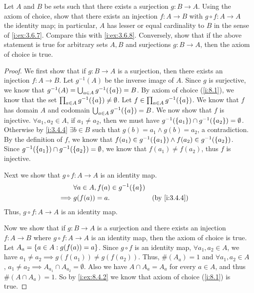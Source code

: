 \begin{ex}\label{i:ex:8.4.3}
  Let \(A\) and \(B\) be sets such that there exists a surjection \(g : B \to A\).
  Using the axiom of choice, show that there exists an injection \(f: A \to B\) with \(g \circ f : A \to A\) the identity map;
  in particular, \(A\) has lesser or equal cardinality to \(B\) in the sense of \cref{i:ex:3.6.7}.
  Compare this with \cref{i:ex:3.6.8}.
  Conversely, show that if the above statement is true for arbitrary sets \(A, B\) and surjections \(g : B \to A\), then the axiom of choice is true.
\end{ex}

\begin{proof}
  We first show that if \(g : B \to A\) is a surjection, then there exists an injection \(f : A \to B\).
  Let \(g^{-1}(A)\) be the inverse image of \(A\).
  Since \(g\) is surjective, we know that \(g^{-1}(A) = \bigcup_{a \in A} g^{-1}(\left\lbrace a\right\rbrace) = B\).
  By axiom of choice (\cref{i:8.1}), we know that the set \(\prod_{a \in A} g^{-1}(\left\lbrace a\right\rbrace) \neq \emptyset\).
  Let \(f \in \prod_{a \in A} g^{-1}(\left\lbrace a\right\rbrace)\).
  We know that \(f\) has domain \(A\) and codomain \(\bigcup_{a \in A} g^{-1}(\left\lbrace a\right\rbrace) = B\).
  We now show that \(f\) is injective.
  \(\forall a_1, a_2 \in A\), if \(a_1 \neq a_2\), then we must have \(g^{-1}(\left\lbrace a_1\right\rbrace) \cap g^{-1}(\left\lbrace a_2\right\rbrace) = \emptyset\).
  Otherwise by \cref{i:3.4.4} \(\exists b \in B\) such that \(g(b) = a_1 \land g(b) = a_2\), a contradiction.
  By the definition of \(f\), we know that \(f(a_1) \in g^{-1}(\left\lbrace a_1\right\rbrace) \land f(a_2) \in g^{-1}(\left\lbrace a_2\right\rbrace)\).
  Since \(g^{-1}(\left\lbrace a_1\right\rbrace) \cap g^{-1}(\left\lbrace a_2\right\rbrace) = \emptyset\), we know that \(f(a_1) \neq f(a_2)\), thus \(f\) is injective.

  Next we show that \(g \circ f : A \to A\) is an identity map.
  \begin{align*}
             & \forall a \in A, f(a) \in g^{-1}(\set{a})                   \\
    \implies & g(f(a)) = a.                              &  & \by{i:3.4.4}
  \end{align*}
  Thus, \(g \circ f : A \to A\) is an identity map.

  Now we show that if \(g : B \to A\) is a surjection and there exists an injection \(f : A \to B\) where \(g \circ f : A \to A\) is an identity map, then the axiom of choice is true.
  Let \(A_a = \left\lbrace a \in A : g(f(a)) = a\right\rbrace\).
  Since \(g \circ f\) is an identity map, \(\forall a_1, a_2 \in A\), we have \(a_1 \neq a_2 \implies g(f(a_1)) \neq g(f(a_2))\).
  Thus, \(\#(A_a) = 1\) and \(\forall a_1, a_2 \in A\), \(a_1 \neq a_2 \implies A_{a_1} \cap A_{a_2} = \emptyset\).
  Also we have \(A \cap A_a = A_a\) for every \(a \in A\), and thus \(\#(A \cap A_a) = 1\).
  So by \cref{i:ex:8.4.2} we know that axiom of choice (\cref{i:8.1}) is true.
\end{proof}
